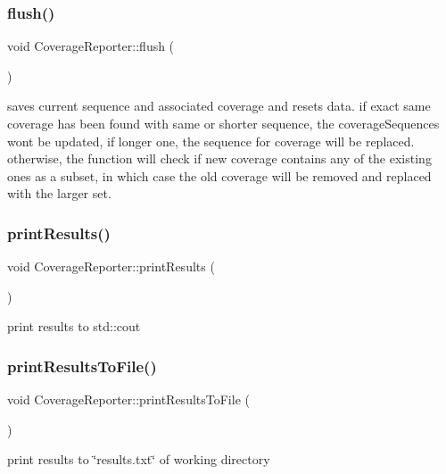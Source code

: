 \subsubsection{\texorpdfstring{flush()}{flush()}}
{\footnotesize\ttfamily void Coverage\+Reporter\+::flush (\begin{DoxyParamCaption}{ }\end{DoxyParamCaption})}

saves current sequence and associated coverage and resets data. if exact same coverage has been found with same or shorter sequence, the coverage\+Sequences won\textquotesingle{}t be updated, if longer one, the sequence for coverage will be replaced. otherwise, the function will check if new coverage contains any of the existing ones as a subset, in which case the old coverage will be removed and replaced with the larger set. \mbox{\label{classCoverageReporter_a4c9c89e13cc4bc7f5cb26441c1e7e723}} 
\subsubsection{\texorpdfstring{print\+Results()}{printResults()}}
{\footnotesize\ttfamily void Coverage\+Reporter\+::print\+Results (\begin{DoxyParamCaption}{ }\end{DoxyParamCaption})}

print results to std\+::cout \mbox{\label{classCoverageReporter_aadef25c261ffd89e68fe9e59da591247}} 
\subsubsection{\texorpdfstring{print\+Results\+To\+File()}{printResultsToFile()}\hspace{0.1cm}{\footnotesize\ttfamily [1/2]}}
{\footnotesize\ttfamily void Coverage\+Reporter\+::print\+Results\+To\+File (\begin{DoxyParamCaption}{ }\end{DoxyParamCaption})}

print results to \char`\"{}results.\+txt\char`\"{} of working directory \mbox{\label{classCoverageReporter_aa195d96544ab9b29a6a6f7fbcb11070a}} 
